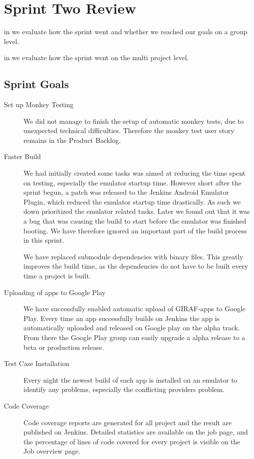 \chapter{Sprint Two Review}\label{chap:sprint2_end}

\begin{chapterorganization}
  \item in  we evaluate how the sprint went and whether we reached our goals on a group level.
  \item in  we evaluate how the sprint went on the multi project level.
\end{chapterorganization}

\section{Sprint Goals}\label{sec:s2_goals}
\begin{description}
    \item[Set up Monkey Testing] We did not manage to finish the setup of automatic monkey tests, due to unexpected technical difficulties. Therefore the monkey test user story remains in the Product Backlog.
    \item[Faster Build] We had initially created some tasks was aimed at reducing the time spent on testing, especially the emulator startup time. However short after the sprint begun, a patch was released to the Jenkins Android Emulator Plugin, which reduced the emulator startup time drastically. As such we down prioritized the emulator related tasks. Later we found out that it was a bug that was causing the build to start before the emulator was finished booting. We have therefore ignored an important part of the build process in this sprint.

    We have replaced submodule dependencies with binary files. This greatly improves the build time, as the dependencies do not have to be built every time a project is built.
    \item[Uploading of apps to Google Play] We have successfully enabled automatic upload of GIRAF-apps to Google Play. Every time an app successfully builds on Jenkins the app is automatically uploaded and released on Google play on the alpha track. From there the Google Play group can easily upgrade a alpha release to a beta or production release.
    \item[Test Case Installation] Every night the newest build of each app is installed on an emulator to identify any problems, especially the conflicting providers problem.
    \item[Code Coverage] Code coverage reports are generated for all project and the result are published on Jenkins. Detailed statistics are available on the job page, and the percentage of lines of code covered for every project is visible on the Job overview page. 
\end{description}

